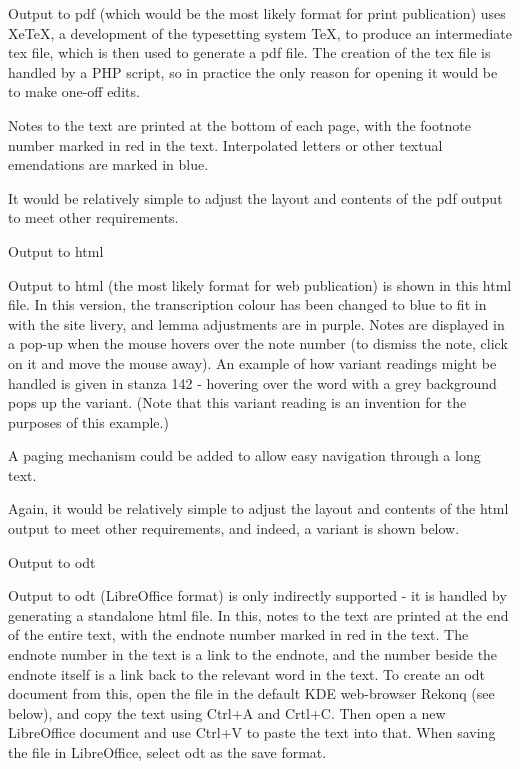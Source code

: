 \documentclass[a4paper,10pt, oneside]{book}
\begin{document}
Output to pdf (which would be the most likely format for print publication) uses XeTeX, a development of the typesetting system TeX, to produce an intermediate tex file, which is then used to generate a pdf file. The creation of the tex file is handled by a PHP script, so in practice the only reason for opening it would be to make one-off edits.

Notes to the text are printed at the bottom of each page, with the footnote number marked in red in the text. Interpolated letters or other textual emendations are marked in blue.

It would be relatively simple to adjust the layout and contents of the pdf output to meet other requirements.

Output to html

Output to html (the most likely format for web publication) is shown in this html file. In this version, the transcription colour has been changed to blue to fit in with the site livery, and lemma adjustments are in purple. Notes are displayed in a pop-up when the mouse hovers over the note number (to dismiss the note, click on it and move the mouse away). An example of how variant readings might be handled is given in stanza 142 - hovering over the word with a grey background pops up the variant. (Note that this variant reading is an invention for the purposes of this example.)

A paging mechanism could be added to allow easy navigation through a long text.

Again, it would be relatively simple to adjust the layout and contents of the html output to meet other requirements, and indeed, a variant is shown below.

Output to odt

Output to odt (LibreOffice format) is only indirectly supported - it is handled by generating a standalone html file. In this, notes to the text are printed at the end of the entire text, with the endnote number marked in red in the text. The endnote number in the text is a link to the endnote, and the number beside the endnote itself is a link back to the relevant word in the text. To create an odt document from this, open the file in the default KDE web-browser Rekonq (see below), and copy the text using Ctrl+A and Crtl+C. Then open a new LibreOffice document and use Ctrl+V to paste the text into that. When saving the file in LibreOffice, select odt as the save format.
\end{document}
